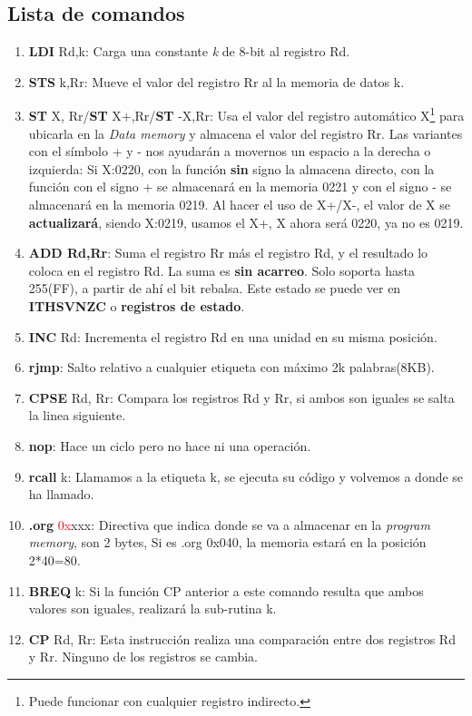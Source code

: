 \documentclass[
	12pt, %
	fleqn, %
	a4paper, %
]{LegrandOrangeBook}
\begin{document}
\subsection{Lista de comandos}
\begin{enumerate}
\item \textbf{LDI} Rd,k: Carga una constante \textit{k} de 8-bit al registro Rd.
\item \textbf{STS} k,Rr: Mueve el valor del registro Rr al la memoria de datos k.
\item \textbf{ST} X, Rr/\textbf{ST} X+,Rr/\textbf{ST} -X,Rr: Usa el valor del registro automático X\footnote{Puede funcionar con cualquier registro indirecto.} para ubicarla en la \textit{Data memory} y almacena el valor del registro Rr. Las variantes con el símbolo + y - nos ayudarán a movernos un espacio a la derecha o izquierda: Si X:0220, con la función \textbf{sin} signo la almacena directo, con la función con el signo + se almacenará en la memoria 0221 y con el signo - se almacenará en la memoria 0219. Al hacer el uso de X+/X-, el valor de X se \textbf{actualizará}, siendo X:0219, usamos el X+, X ahora será 0220, ya no es 0219.
\item \textbf{ADD Rd,Rr}: Suma el registro Rr más el registro Rd, y el resultado lo coloca en el registro Rd. La suma es \textbf{sin acarreo}. Solo soporta hasta 255(FF), a partir de ahí el bit rebalsa. Este estado se puede ver en \textbf{ITHSVNZC} o \textbf{registros de estado}.
\item \textbf{INC} Rd: Incrementa el registro Rd en una unidad en su misma posición.
\item \textbf{rjmp}: Salto relativo a cualquier etiqueta con máximo 2k palabras(8KB).
\item \textbf{CPSE} Rd, Rr: Compara los registros Rd y Rr, si ambos son iguales se salta la linea siguiente.
\item \textbf{nop}: Hace un ciclo pero no hace ni una operación.
\item \textbf{rcall} k: Llamamos a la etiqueta k, se ejecuta su código y volvemos a donde se ha llamado.
\item \textbf{.org} \textcolor{red}{0x}xxx: Directiva que indica donde se va a almacenar en la \textit{program memory}, son 2 bytes, Si es .org 0x040, la memoria estará en la posición 2*40=80.
\item \textbf{BREQ} k: Si la función CP anterior a este comando resulta que ambos valores son iguales, realizará la sub-rutina k.
\item \textbf{CP} Rd, Rr: Esta instrucción realiza una comparación entre dos registros Rd y Rr. Ninguno de los registros se cambia.

\end{enumerate}
\end{document}
